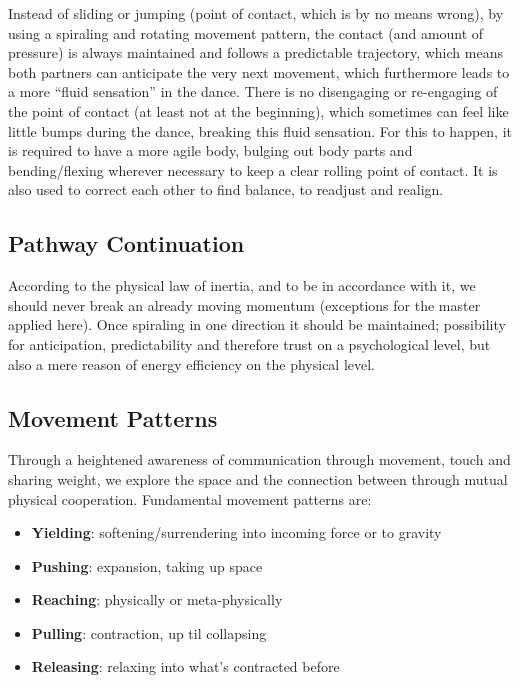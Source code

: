 Instead of sliding or jumping (point of contact, which is by no means wrong), by using a spiraling and rotating movement pattern, the contact (and amount of pressure) is always maintained and follows a predictable trajectory, which means both partners can anticipate the very next movement, which furthermore leads to a more ``fluid sensation'' in the dance.
There is no disengaging or re-engaging of the point of contact (at least not at the beginning), which sometimes can feel like little bumps during the dance, breaking this fluid sensation.
For this to happen, it is required to have a more agile body, bulging out body parts and bending/flexing wherever necessary to keep a clear rolling point of contact.
It is also used to correct each other to find balance, to readjust and realign.

\subsection{Pathway Continuation}\label{subsec:pathway-continuation}

According to the physical law of inertia, and to be in accordance with it, we should never break an already moving momentum (exceptions for the master applied here).
Once spiraling in one direction it should be maintained; possibility for anticipation, predictability and therefore trust on a psychological level, but also a mere reason of energy efficiency on the physical level.

\subsection{Movement Patterns}\label{subsec:movement-patterns}

Through a heightened awareness of communication through movement, touch and sharing weight, we explore the space and the connection between through mutual physical cooperation.
Fundamental movement patterns are:

\begin{itemize}
    \item \textbf{Yielding}: softening/surrendering into incoming force or to gravity
    \item \textbf{Pushing}: expansion, taking up space
    \item \textbf{Reaching}: physically or meta-physically
    \item \textbf{Pulling}: contraction, up til collapsing
    \item \textbf{Releasing}: relaxing into what's contracted before
\end{itemize}

